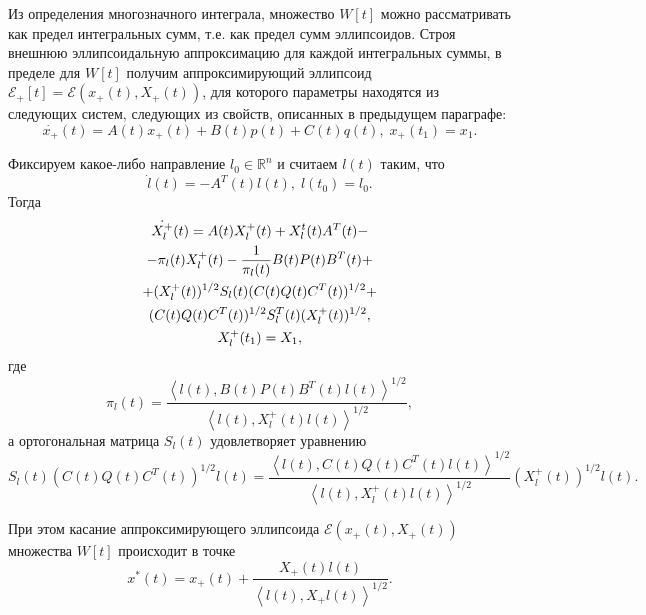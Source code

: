 \documentclass[12pt]{article}
\theoremstyle{rusdef}
\newcommand{\scalar}[2]{\left<#1,#2\right>}
\newcommand{\R}{\ensuremath{\mathbb{R}}} %
\newcommand{\E}{\ensuremath{\mathcal{E}}} %
\begin{document}
Из определения многозначного интеграла, множество $W[t]$ можно рассматривать как предел интегральных сумм, т.е. как предел сумм эллипсоидов. Строя внешнюю эллипсоидальную аппроксимацию для каждой интегральных суммы, в пределе для $W[t]$ получим аппроксимирующий эллипсоид $\E_+[t] = \E(x_+(t), X_+(t))$, для которого параметры находятся из следующих систем, следующих из свойств, описанных в предыдущем параграфе:
$$
\dot{x_+}(t) = A(t)x_+(t) + B(t)p(t) + C(t)q(t), \; x_+(t_1) = x_1.
$$

Фиксируем какое-либо направление $l_0 \in \R^n$ и считаем $l(t)$ таким, что
$$
\dot{l}(t) = -A^T(t)l(t), \; l(t_0) = l_0.
$$
Тогда
\begin{gather}
\dot{X_l^+}(t) = A(t)X_l^+(t) + X_l^t(t)A^T(t) - \notag \\
- \pi_l(t) X_l^+(t) - \frac{1}{\pi_l(t)} B(t)P(t)B^T(t) + \notag \\
+ (X_l^+(t))^{1/2} S_l(t) (C(t) Q(t) C^T(t))^{1/2} + \notag \\
(C(t) Q(t) C^T(t))^{1/2} S_l^T(t) (X_l^+(t))^{1/2}, \notag \\
X_l^+(t_1) = X_1, \notag
\end{gather}
где
$$
\pi_l(t) = \frac{\scalar{l(t)}{B(t)P(t)B^T(t)l(t)}^{1/2}}{\scalar{l(t)}{X_l^+(t)l(t)}^{1/2}},
$$
а ортогональная матрица $S_l(t)$ удовлетворяет уравнению
$$
S_l(t) (C(t)Q(t)C^T(t))^{1/2} l(t) = \frac{\scalar{l(t)}{C(t)Q(t)C^T(t)l(t)}^{1/2}}{\scalar{l(t)}{X_l^+(t)l(t)}^{1/2}} (X_l^+(t))^{1/2} l(t).
$$

При этом касание аппроксимирующего эллипсоида $\E(x_+(t), X_+(t))$ множества $W[t]$ происходит в точке
$$
x^*(t) = x_+(t) + \frac{X_+(t)l(t)}{\scalar{l(t)}{X_+l(t)}^{1/2}}.
$$
\end{document}
